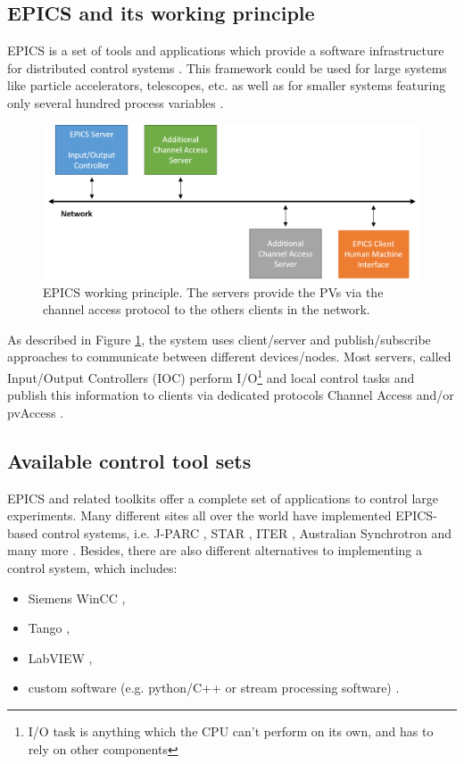 


\subsection{EPICS and its working principle} 
\label{EPICS}
EPICS is a set of tools and applications which provide a software infrastructure for distributed control systems \cite{EPICS_license}. This framework could be used for large systems like particle accelerators, telescopes, etc. as well as for smaller systems featuring only several hundred process variables \cite{EPICS_1, EPICS_2, EPICS_3, EPICS_4}.
\begin{figure}[!h]
\centering
\includegraphics[width=0.7\columnwidth]{Chapter3/Controls/images/EPICS.png}
\caption{EPICS working principle. The servers provide the \glspl{PV} via the channel access protocol to the others clients in the network.}
\label{fig_EPICS}
\end{figure}

As described in Figure \ref{fig_EPICS}, the system uses client/server and publish/subscribe approaches to communicate between different devices/nodes. Most servers, called Input/Output Controllers (\gls{IOC}) perform I/O\footnote{ I/O task is anything which the CPU can't perform on its own, and has to rely on other components} and local control tasks and publish this information to clients via dedicated protocols Channel Access and/or pvAccess \cite{EPICS}. 

 \subsection{Available control tool sets}
 EPICS and related toolkits offer a complete set of applications to control large experiments. Many different sites all over the world have implemented \gls{EPICS}-based control systems, i.e. \gls{J-PARC} \cite{J-PARC}, \gls{STAR} \cite{STAR}, \gls{ITER} \cite{ITER}, Australian Synchrotron and many more \cite{EPICS_site}. Besides, there are also different alternatives to implementing a control system, which includes: 
 \begin{itemize}
     \item Siemens WinCC \cite{Camacho:2022fxa,Goralczyk:2022udx},
     \item Tango \cite{Santander-Vela:2021tma},
     \item LabVIEW \cite{State:2022qlw},
     \item custom software (e.g. python/C++ or stream processing software) \cite{taurus}.
 \end{itemize} 
 
